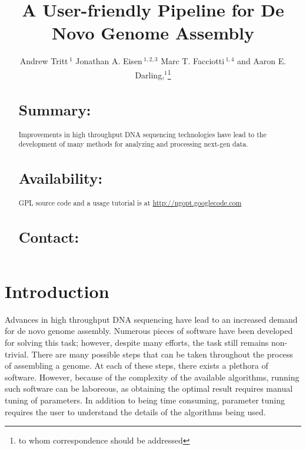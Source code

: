 \documentclass{bioinfo}
\begin{document}

\title[a5]{A User-friendly Pipeline for De Novo Genome Assembly}
\author[Tritt \textit{et~al}]{Andrew Tritt\,$^{1}$ Jonathan A. Eisen\,$^{1,2,3}$ Marc T. Facciotti\,$^{1,4}$ and Aaron E. Darling,$^{1}$\footnote{to whom correspondence should be addressed}}
\address{$^{1}$Genome Center, $^{2}$ Dept. of Evolution and Ecology, $^{3}$ Medical Microbiology and Immunology, 
$^{4}$ Biomedical Engineering, University of California-Davis, Davis, CA 95616.}



\maketitle

\begin{abstract}

\section{Summary:}
Improvements in high throughput DNA sequencing technologies have lead to the development of
many methods for analyzing and processing next-gen data. 
\section{Availability:}
GPL source code and a usage tutorial is at \href{http://ngopt.googlecode.com}{http://ngopt.googlecode.com}

\section{Contact:} \href{rabid apes}{}
\end{abstract}

\section{Introduction}
Advances in high throughput DNA sequencing have lead to an increased demand for de novo 
genome assembly. Numerous pieces of software have been developed for solving this task; 
however, despite many efforts, the task still remains non-trivial. There are many possible
steps that can be taken throughout the process of assembling a genome. At each of these steps,
there exists a plethora of software. However, because of the complexity of the available algorithms,
running such software can be laboreous, as obtaining the optimal result requires manual tuning of parameters.
In addition to being time consuming, parameter tuning requires the user to understand the details
of the algorithms being used. 
\end{document}
